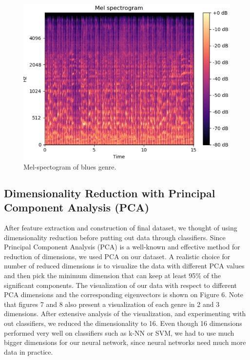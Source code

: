 \begin{figure}
\begin{center}
\includegraphics[scale=0.2]{./figures/blues.png}
\end{center}
\caption
{
Mel-spectogram of blues genre. 
}
\label{fig:big_picture5}
\end{figure}

\subsection{Dimensionality Reduction with Principal Component Analysis (PCA)}
After feature extraction and construction of final dataset, we thought of using dimensionality reduction before putting out data through classifiers. Since Principal Component Analysis (PCA) is a well-known and effective method for reduction of dimensions, we used PCA on our dataset. A realistic choice for number of reduced dimensions is to visualize the data with different PCA values and then pick the minimum dimension that can keep at least 95\% of the significant components. The visualization of our data with respect to different PCA dimensions and the corresponding eigenvectors is shown on Figure 6. Note that figures 7 and 8 also present a visualization of each genre in 2 and 3 dimensions. After extensive analysis of the visualization, and experimenting with out classifiers, we reduced the dimensionality to 16. Even though 16 dimensions performed very well on classifiers such as k-NN or SVM, we had to use much bigger dimensions for our neural network, since neural networks need much more data in practice. 

